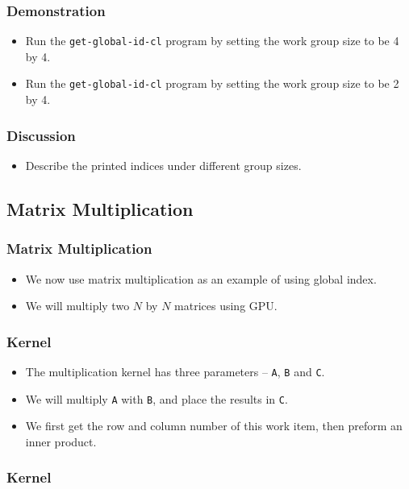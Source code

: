 \documentclass{beamer}
\begin{document}
\begin{frame}
  \frametitle{Demonstration}
  \begin{itemize}
    \item Run the {\tt get-global-id-cl} program by setting the work
      group size to be 4 by 4.
    \item Run the {\tt get-global-id-cl} program by setting the work
      group size to be 2 by 4.
  \end{itemize}
\end{frame}

\begin{frame}
  \frametitle{Discussion}
  \begin{itemize}
  \item Describe the printed indices under different group sizes.
  \end{itemize}
\end{frame}

\subsection{Matrix Multiplication}

\begin{frame}
  \frametitle{Matrix Multiplication} 
  \begin{itemize}
    \item We now use matrix multiplication as an example of using
      global index.
    \item We will multiply two $N$ by $N$ matrices using GPU.
  \end{itemize}
\end{frame}

\begin{frame}
  \frametitle{Kernel}
  \begin{itemize}
    \item The multiplication kernel has three parameters -- {\tt A},
      {\tt B} and {\tt C}.
    \item We will multiply {\tt A} with {\tt B}, and place the results
      in {\tt C}.
    \item We first get the row and column number of this work item,
      then preform an inner product.
  \end{itemize}
\end{frame}

\begin{frame}
  \frametitle{Kernel}
\end{frame}
\end{document}
